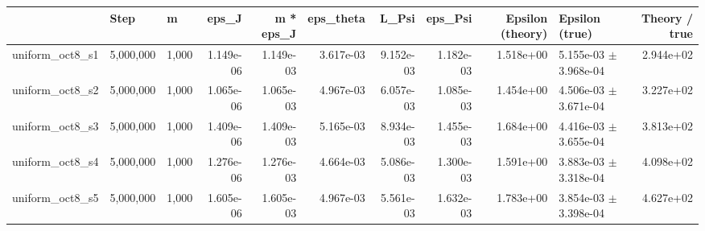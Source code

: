 \begin{tabular}{lllrrrrrrlr}
\toprule
 & Step & m & eps\_J & m * eps\_J & eps\_theta & L\_Psi & eps\_Psi & Epsilon (theory) & Epsilon (true) & Theory / true \\
\midrule
uniform\_oct8\_s1 & 5,000,000 & 1,000 & 1.149e-06 & 1.149e-03 & 3.617e-03 & 9.152e-03 & 1.182e-03 & 1.518e+00 & 5.155e-03 $\pm$ 3.968e-04 & 2.944e+02 \\
uniform\_oct8\_s2 & 5,000,000 & 1,000 & 1.065e-06 & 1.065e-03 & 4.967e-03 & 6.057e-03 & 1.085e-03 & 1.454e+00 & 4.506e-03 $\pm$ 3.671e-04 & 3.227e+02 \\
uniform\_oct8\_s3 & 5,000,000 & 1,000 & 1.409e-06 & 1.409e-03 & 5.165e-03 & 8.934e-03 & 1.455e-03 & 1.684e+00 & 4.416e-03 $\pm$ 3.655e-04 & 3.813e+02 \\
uniform\_oct8\_s4 & 5,000,000 & 1,000 & 1.276e-06 & 1.276e-03 & 4.664e-03 & 5.086e-03 & 1.300e-03 & 1.591e+00 & 3.883e-03 $\pm$ 3.318e-04 & 4.098e+02 \\
uniform\_oct8\_s5 & 5,000,000 & 1,000 & 1.605e-06 & 1.605e-03 & 4.967e-03 & 5.561e-03 & 1.632e-03 & 1.783e+00 & 3.854e-03 $\pm$ 3.398e-04 & 4.627e+02 \\
\bottomrule
\end{tabular}
